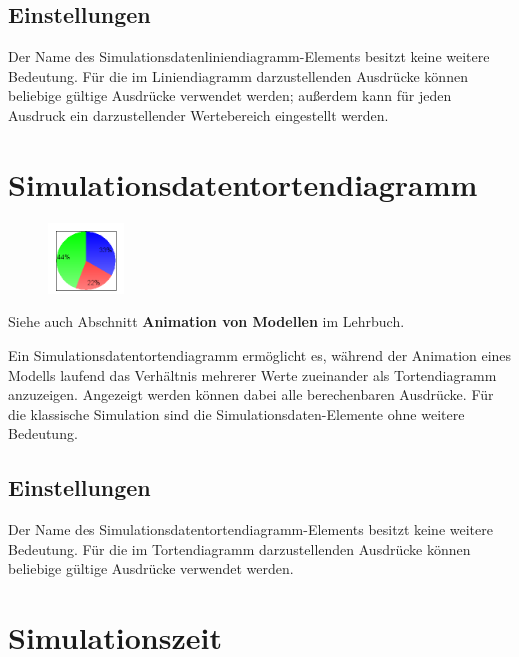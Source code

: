 \subsection*{Einstellungen}

Der Name des Simulationsdatenliniendiagramm-Elements besitzt keine weitere Bedeutung. Für die im
Liniendiagramm darzustellenden Ausdrücke können beliebige gültige Ausdrücke verwendet werden;
außerdem kann für jeden Ausdruck ein darzustellender Wertebereich eingestellt werden.


\section{Simulationsdatentortendiagramm}
\label{ref:ModelElementAnimationPieChart}

\begin{figure}
\vspace{-22pt}
\includegraphics[width=2cm]{imageModelElementAnimationPieChart.png}
\vspace{-22pt}
\end{figure}

Siehe auch Abschnitt \textbf{Animation von Modellen} im Lehrbuch.

Ein Simulationsdatentortendiagramm ermöglicht es, während der Animation eines Modells laufend 
das Verhältnis mehrerer Werte zueinander als Tortendiagramm anzuzeigen.
Angezeigt werden können dabei alle berechenbaren Ausdrücke. Für die klassische Simulation sind die
Simulationsdaten-Elemente ohne weitere Bedeutung.

\subsection*{Einstellungen}

Der Name des Simulationsdatentortendiagramm-Elements besitzt keine weitere Bedeutung. Für die im
Tortendiagramm darzustellenden Ausdrücke können beliebige gültige Ausdrücke verwendet werden.


\section{Simulationszeit}
\label{ref:ModelElementAnimationClock}

